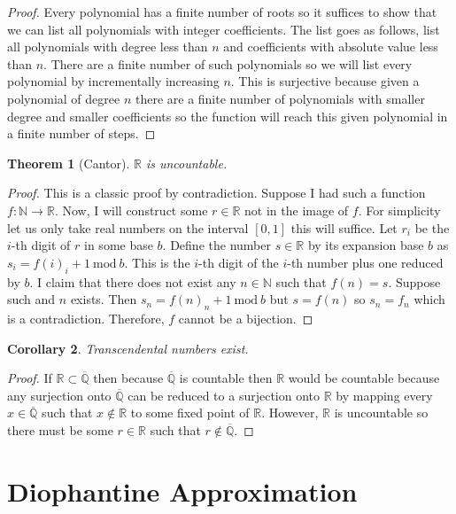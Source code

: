 \documentclass{article}
\newcommand{\N}{\mathbb{N}}
\newcommand{\Q}{\mathbb{Q}}
\newcommand{\R}{\mathbb{R}}
\theoremstyle{theorem}
\newtheorem{theorem}{Theorem}[section]
\newtheorem{corollary}[theorem]{Corollary}
\theoremstyle{definition}
\theoremstyle{definition}
\theoremstyle{remark}
\theoremstyle{definition}
\theoremstyle{remark}
\begin{document}
\begin{proof}
Every polynomial has a finite number of roots so it suffices to show that we can list all polynomials with integer coefficients. The list goes as follows, list all polynomials with degree less than $n$ and coefficients with absolute value less than $n$. There are a finite number of such polynomials so we will list every polynomial by incrementally increasing $n$. This is surjective because given a polynomial of degree $n$ there are a finite number of polynomials with smaller degree and smaller coefficients so the function will reach this given polynomial in a finite number of steps.   
\end{proof}

\begin{theorem}[Cantor]
$\R$ is uncountable.
\end{theorem}

\begin{proof}
This is a classic proof by contradiction. Suppose I had such a function $f : \N \to \R$. Now, I will construct some $r \in \R$ not in the image of $f$. For simplicity let us only take real numbers on the interval $[0, 1]$ this will suffice. Let $r_i$ be the $i$-th digit of $r$ in some base $b$. Define the number $s \in \R$ by its expansion base $b$ as $s_i = f(i)_i + 1 \: \mathrm{mod} \: b$. This is the $i$-th digit of the $i$-th number plus one reduced by $b$. I claim that there does not exist any $n \in \N$ such that $f(n) = s$. Suppose such and $n$ exists. Then $s_n = f(n)_n + 1 \: \mathrm{mod} \: b$ but $s = f(n)$ so $s_n = f_n$ which is a contradiction. Therefore, $f$ cannot be a bijection.   
\end{proof}

\begin{corollary}
Transcendental numbers exist.
\end{corollary}

\begin{proof}
If $\R \subset \overline{\Q}$ then because $\overline{\Q}$ is countable then $\R$ would be countable because any surjection onto $\overline{\Q}$ can be reduced to a surjection onto $\R$ by mapping every $x \in \overline{\Q}$ such that $x \notin \R$ to some fixed point of $\R$. However, $\R$ is uncountable so there must be some $r \in \R$ such that $r \notin \overline{\Q}$. 
\end{proof}

\section{Diophantine Approximation}
\end{document}
